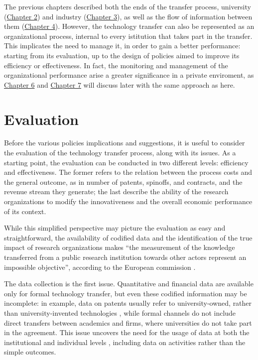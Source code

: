 

\label{Chapter5} %

The previous chapters described both the ends of the transfer process, university (\hyperref[Chapter2]{Chapter 2}) and industry (\hyperref[Chapter3]{Chapter 3}), as well as the flow of information between them (\hyperref[Chapter4]{Chapter 4}). However, the technology transfer can also be represented as an organizational process, internal to every istitution that takes part in the transfer. This implicates the need to manage it, in order to gain a better performance: starting from its evaluation, up to the design of policies aimed to improve its efficiency or effectiveness. In fact, the monitoring and management of the organizational performance arise a greater significance in a private enviroment, as \hyperref[Chapter6]{Chapter 6} and \hyperref[Chapter7]{Chapter 7} will discuss later with the same approach as here.

\section{Evaluation}

Before the various policies implications and suggestions, it is useful to consider the evaluation of the technology transfer process, along with its issues. As a starting point, the evaluation can be conducted in two different levels: efficiency and effectiveness. The former refers to the relation between the process costs and the general outcome, as in number of patents, spinoffs, and contracts, and the revenue stream they generate; the last describe the ability of the research organizations to modify the innovativeness and the overall economic performance of its context. 

While this simplified perspective may picture the evaluation as easy and straightforward, the availability of codified data and the identification of the true impact of research organizations makes \enquote{the measurement of the knowledge transferred from a public research institution towards other actors represent an impossible objective}, according to the European commission \citep{Balderi2010}. 

The data collection is the first issue. Quantitative and financial data are available only for formal technology transfer, but even these codified information may be incomplete: in example, data on patents usually refer to university-owned, rather than university-invented technologies \citep{Geuna2009}, while formal channels do not include direct transfers between academics and firms, where universities do not take part in the agreement. This issue uncovers the need for the usage of data at both the institutional and individual levels \citep{Wong2010}, including data on activities rather than the simple outcomes. 

